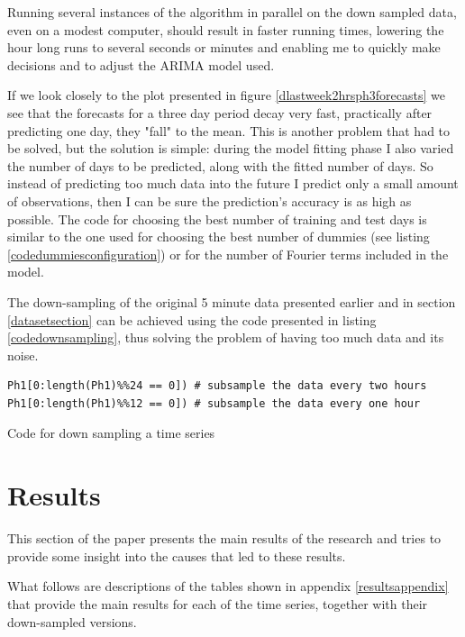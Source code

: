 \documentclass[12pt,a4paper,titlepage]{report}
\begin{document}
Running several instances of the algorithm in parallel on the down sampled data, even on a modest computer, should result in faster running times, lowering the hour long runs to several seconds or minutes and enabling me to quickly make decisions and to adjust the ARIMA model used.

If we look closely to the plot presented in figure \ref{dlastweek2hrsph3forecasts} we see that the forecasts for a three day period decay very fast, practically after predicting one day, they "fall" to the mean. This is another problem that had to be solved, but the solution is simple: during the model fitting phase I also varied the number of days to be predicted, along with the fitted number of days. So instead of predicting too much data into the future I predict only a small amount of observations, then I can be sure the prediction's accuracy is as high as possible.
The code for choosing the best number of training and test days is similar to the one used for choosing the best number of dummies (see listing \ref{codedummiesconfiguration}) or for the number of Fourier terms included in the model.

The down-sampling of the original 5 minute data presented earlier and in section \ref{datasetsection} can be achieved using the code presented in listing \ref{codedownsampling}, thus solving the problem of having too much data and its noise.

\begin{listing}[h]
    \begin{verbatim}
Ph1[0:length(Ph1)%%24 == 0]) # subsample the data every two hours
Ph1[0:length(Ph1)%%12 == 0]) # subsample the data every one hour
    \end{verbatim}
    
    \caption{Code for down sampling a time series}
    \label{codedownsampling}
\end{listing}

\section{Results} \label{resultssection}

This section of the paper presents the main results of the research and tries to provide some insight into the causes that led to these results.

What follows are descriptions of the tables shown in appendix \ref{resultsappendix} that provide the main results for each of the time series, together with their down-sampled versions.
\end{document}
